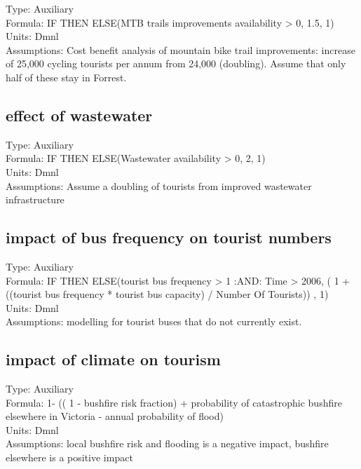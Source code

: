 \documentclass[
  11pt,
]{book}
\begin{document}
Type: Auxiliary\\
Formula: IF THEN ELSE(MTB trails improvements availability \textgreater{} 0, 1.5, 1)\\
Units: Dmnl\\
Assumptions: Cost benefit analysis of mountain bike trail improvements: increase of 25,000 cycling tourists per annum from 24,000 (doubling). Assume that only half of these stay in Forrest.

\hypertarget{effect-of-wastewater}{%
\subsection{effect of wastewater}\label{effect-of-wastewater}}

Type: Auxiliary\\
Formula: IF THEN ELSE(Wastewater availability \textgreater{} 0, 2, 1)\\
Units: Dmnl\\
Assumptions: Assume a doubling of tourists from improved wastewater infrastructure

\hypertarget{impact-of-bus-frequency-on-tourist-numbers}{%
\subsection{impact of bus frequency on tourist numbers}\label{impact-of-bus-frequency-on-tourist-numbers}}

Type: Auxiliary\\
Formula: IF THEN ELSE(tourist bus frequency \textgreater{} 1 :AND: Time \textgreater{} 2006, ( 1 + ((tourist bus frequency * tourist bus capacity) / Number Of Tourists)) , 1)\\
Units: Dmnl\\
Assumptions: modelling for tourist buses that do not currently exist.

\hypertarget{impact-of-climate-on-tourism}{%
\subsection{impact of climate on tourism}\label{impact-of-climate-on-tourism}}

Type: Auxiliary\\
Formula: 1- (( 1 - bushfire risk fraction) + probability of catastrophic bushfire elsewhere in Victoria - annual probability of flood)\\
Units: Dmnl\\
Assumptions: local bushfire risk and flooding is a negative impact, bushfire elsewhere is a positive impact
\end{document}
